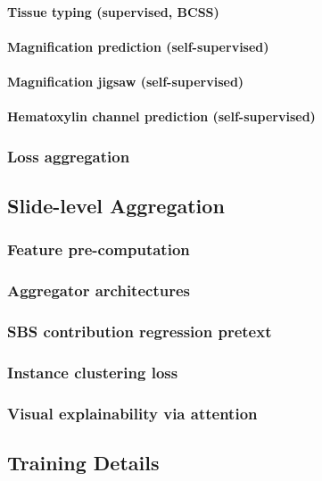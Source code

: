             \paragraph{Tissue typing (supervised, BCSS)}
            \paragraph{Magnification prediction (self-supervised)}
            \paragraph{Magnification jigsaw (self-supervised)}
            \paragraph{Hematoxylin channel prediction (self-supervised)}
        
            \subsubsection{Loss aggregation}

    \subsection{Slide-level Aggregation}\label{sec:method/slide}
        \subsubsection{Feature pre-computation}
        
        \subsubsection{Aggregator architectures}
        
        \subsubsection{SBS contribution regression pretext}
        
        \subsubsection{Instance clustering loss}
        
        \subsubsection{Visual explainability via attention} 

    \subsection{Training Details}
